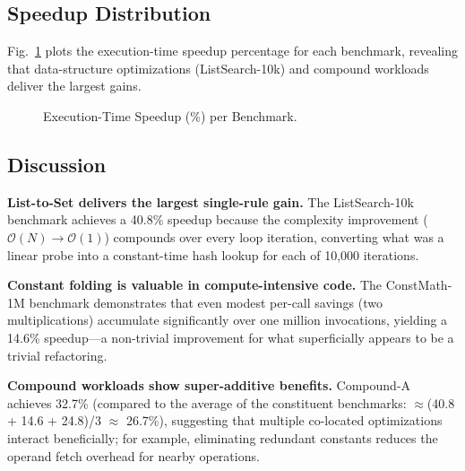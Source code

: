 \documentclass[conference]{IEEEtran}
\begin{document}
\subsection{Speedup Distribution}

Fig.~\ref{fig:speedup} plots the execution-time speedup percentage for each
benchmark, revealing that data-structure optimizations (ListSearch-10k) and
compound workloads deliver the largest gains.

\begin{figure}[h]
\centering
{}
\caption{Execution-Time Speedup (\%) per Benchmark.}
\label{fig:speedup}
\end{figure}

\subsection{Discussion}

\textbf{List-to-Set delivers the largest single-rule gain.}  The
ListSearch-10k benchmark achieves a 40.8\% speedup because the complexity
improvement ($\mathcal{O}(N) \to \mathcal{O}(1)$) compounds over every
loop iteration, converting what was a linear probe into a constant-time
hash lookup for each of 10,000 iterations.

\textbf{Constant folding is valuable in compute-intensive code.}  The
ConstMath-1M benchmark demonstrates that even modest per-call savings (two
multiplications) accumulate significantly over one million invocations,
yielding a 14.6\% speedup---a non-trivial improvement for what superficially
appears to be a trivial refactoring.

\textbf{Compound workloads show super-additive benefits.}  Compound-A
achieves 32.7\% (compared to the average of the constituent benchmarks:
$\approx$(40.8 + 14.6 + 24.8)/3 $\approx$ 26.7\%), suggesting that
multiple co-located optimizations interact beneficially; for example,
eliminating redundant constants reduces the operand fetch overhead for
nearby operations.
\end{document}
